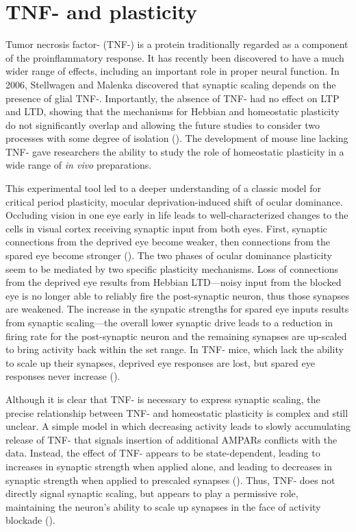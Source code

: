 \section{TNF-\textalpha{} and plasticity}

Tumor necrosis factor-\textalpha{} (TNF-\textalpha{}) is a protein traditionally regarded as a component of the proinflammatory response. It has recently been discovered to have a much wider range of effects, including an important role in proper neural function. In 2006, Stellwagen and Malenka discovered that synaptic scaling depends on the presence of glial TNF-\textalpha{}. Importantly, the absence of TNF-\textalpha{} had no effect on LTP and LTD, showing that the mechanisms for Hebbian and homeostatic plasticity do not significantly overlap and allowing the future studies to consider two processes with some degree of isolation (\cite{Stellwagen2006}). The development of mouse line lacking TNF-\textalpha{} gave researchers the ability to study the role of homeostatic plasticity in a wide range of \textit{in vivo} preparations.

This experimental tool led to a deeper understanding of a classic model for critical period plasticity, mocular deprivation-induced shift of ocular dominance. Occluding vision in one eye early in life leads to well-characterized changes to the cells in visual cortex receiving synaptic input from both eyes. First, synaptic connections from the deprived eye become weaker, then connections from the spared eye become stronger (\cite{Frenkel2004}). The two phases of ocular dominance plasticity seem to be mediated by two specific plasticity mechanisms. Loss of connections from the deprived eye results from Hebbian LTD---noisy input from the blocked eye is no longer able to reliably fire the post-synaptic neuron, thus those synapses are weakened. The increase in the synpatic strengths for spared eye inputs results from synaptic scaling---the overall lower synaptic drive leads to a reduction in firing rate for the post-synaptic neuron and the remaining synapses are up-scaled to bring activity back within the set range. In TNF-\textalpha{} mice, which lack the ability to scale up their synapses, deprived eye responses are lost, but spared eye responses never increase (\cite{Kaneko2008}).

Although it is clear that TNF-\textalpha{} is necessary to express synaptic scaling, the precise relationship between TNF-\textalpha{} and homeostatic plasticity is complex and still unclear. A simple model in which decreasing activity leads to slowly accumulating release of TNF-\textalpha{} that signals insertion of additional AMPARs conflicts with the data. Instead, the effect of TNF-\textalpha{} appears to be state-dependent, leading to increases in synaptic strength when applied alone, and leading to decreases in synaptic strength when applied to prescaled synapses (\cite{Steinmetz2010}). Thus, TNF-\textalpha{} does not directly signal synaptic scaling, but appears to play a permissive role, maintaining the neuron's ability to scale up synapses in the face of activity blockade (\cite{Steinmetz2010}).

